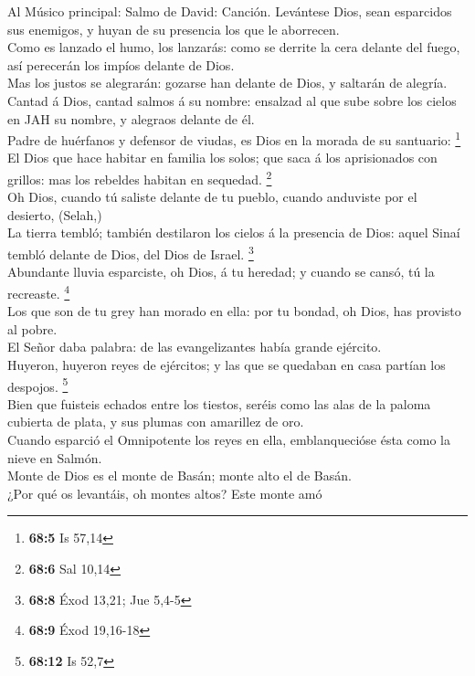  Al Músico principal: Salmo de David: Canción. Levántese
Dios, sean esparcidos sus enemigos, y huyan de su presencia los que le
aborrecen.\\
 Como es lanzado el humo, los lanzarás: como se derrite la
cera delante del fuego, así perecerán los impíos delante de Dios.\\
 Mas los justos se alegrarán: gozarse han delante de Dios, y
saltarán de alegría.\\
 Cantad á Dios, cantad salmos á su nombre: ensalzad al que
sube sobre los cielos en JAH su nombre, y alegraos delante de él.\\
 Padre de huérfanos y defensor de viudas, es Dios en la
morada de su santuario: \footnote{\textbf{68:5} Is 57,14}\\
 El Dios que hace habitar en familia los solos; que saca á
los aprisionados con grillos: mas los rebeldes habitan en sequedad.
\footnote{\textbf{68:6} Sal 10,14}\\
 Oh Dios, cuando tú saliste delante de tu pueblo, cuando
anduviste por el desierto, (Selah,)\\
 La tierra tembló; también destilaron los cielos á la
presencia de Dios: aquel Sinaí tembló delante de Dios, del Dios de
Israel. \footnote{\textbf{68:8} Éxod 13,21; Jue 5,4-5}\\
 Abundante lluvia esparciste, oh Dios, á tu heredad; y
cuando se cansó, tú la recreaste. \footnote{\textbf{68:9} Éxod 19,16-18}\\
 Los que son de tu grey han morado en ella: por tu bondad,
oh Dios, has provisto al pobre.\\
 El Señor daba palabra: de las evangelizantes había grande
ejército.\\
 Huyeron, huyeron reyes de ejércitos; y las que se quedaban
en casa partían los despojos. \footnote{\textbf{68:12} Is 52,7}\\
 Bien que fuisteis echados entre los tiestos, seréis como
las alas de la paloma cubierta de plata, y sus plumas con amarillez de
oro.\\
 Cuando esparció el Omnipotente los reyes en ella,
emblanquecióse ésta como la nieve en Salmón.\\
 Monte de Dios es el monte de Basán; monte alto el de
Basán.\\
 ¿Por qué os levantáis, oh montes altos? Este monte amó
